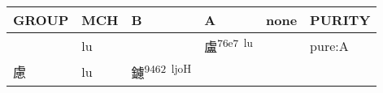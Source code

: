 \documentclass[14pt,a4paper]{scrartcl}
\begin{document}
\begin{longtable}[c]{@{}llllll@{}}
\toprule
\begin{minipage}[b]{0.14\columnwidth}\raggedright\strut
GROUP
\strut\end{minipage} &
\begin{minipage}[b]{0.14\columnwidth}\raggedright\strut
MCH
\strut\end{minipage} &
\begin{minipage}[b]{0.14\columnwidth}\raggedright\strut
B
\strut\end{minipage} &
\begin{minipage}[b]{0.14\columnwidth}\raggedright\strut
A
\strut\end{minipage} &
\begin{minipage}[b]{0.14\columnwidth}\raggedright\strut
none
\strut\end{minipage} &
\begin{minipage}[b]{0.14\columnwidth}\raggedright\strut
PURITY
\strut\end{minipage}\tabularnewline
\midrule
\endhead
\begin{minipage}[t]{0.14\columnwidth}\raggedright\strut
𧆣
\strut\end{minipage} &
\begin{minipage}[t]{0.14\columnwidth}\raggedright\strut
lu
\strut\end{minipage} &
\begin{minipage}[t]{0.14\columnwidth}\raggedright\strut
\strut\end{minipage} &
\begin{minipage}[t]{0.14\columnwidth}\raggedright\strut
盧\textsuperscript{76e7~lu}
\strut\end{minipage} &
\begin{minipage}[t]{0.14\columnwidth}\raggedright\strut
\strut\end{minipage} &
\begin{minipage}[t]{0.14\columnwidth}\raggedright\strut
pure:A
\strut\end{minipage}\tabularnewline
\begin{minipage}[t]{0.14\columnwidth}\raggedright\strut
慮
\strut\end{minipage} &
\begin{minipage}[t]{0.14\columnwidth}\raggedright\strut
lu
\strut\end{minipage} &
\begin{minipage}[t]{0.14\columnwidth}\raggedright\strut
鑢\textsuperscript{9462~ljoH}
\strut\end{minipage} &

\end{longtable}
\end{document}
